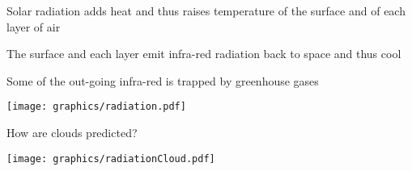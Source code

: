 \begin{slide}{}
\begin{minipage}[t]{0.4\linewidth}

\begin{list0}
\item Solar radiation adds heat and thus raises temperature of the surface and of each layer of air

\item The surface and each layer emit infra-red radiation back to space and thus cool

\item Some of the out-going infra-red is trapped by greenhouse gases 
\end{list0}

\end{minipage}
\hfill
\begin{minipage}[t]{0.54\linewidth}\vspace{-0.01in}
\texttt{[image: graphics/radiation.pdf]}
\end{minipage}
\end{slide}

\begin{slide}{}
\begin{minipage}[t]{0.4\linewidth}
\begin{list0}
\item How are clouds predicted?
\end{list0}
\end{minipage}
\hfill
\begin{minipage}[t]{0.54\linewidth}\vspace{-0.01in}
\texttt{[image: graphics/radiationCloud.pdf]}
\end{minipage}
\end{slide}

